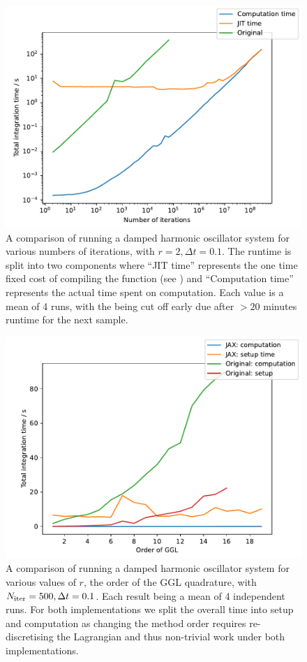 \begin{figure}[t]
  \label{fig:dho-n-runtime}
  \includegraphics[width=\columnwidth]{figures/dho_n_runtime.pdf}
  \caption{A comparison of running a damped harmonic oscillator system for various numbers of iterations, with $r = 2, \Delta t = 0.1$. The \updimpl{} runtime is split into two components where \enquote{JIT time} represents the one time fixed cost of compiling the function (see ) and \enquote{Computation time} represents the actual time spent on computation.
  Each value is a mean of 4 runs, with the \orgimpl{} being cut off early due after $> 20$ minutes runtime for the next sample.}
\end{figure}

\begin{figure}[t]
  \label{fig:dho-r-runtime}
  \includegraphics[width=\columnwidth]{figures/dho_r_runtime_linear.pdf}
  \caption{A comparison of running a damped harmonic oscillator system for various values of $r$, the order of the GGL quadrature, with $N_{\mathrm{iter}} = 500, \Delta t = 0.1$. Each result being a mean of 4 independent runs.
	For both implementations we split the overall time into setup and computation as changing the method order requires re-discretising the Lagrangian and thus non-trivial work under both implementations.}
\end{figure}

